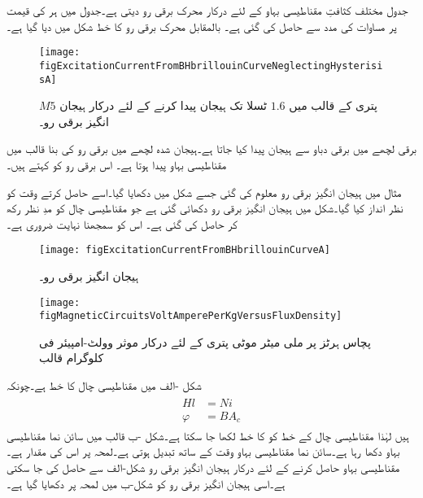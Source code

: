 جدول   مختلف کثافتِ مقناطیسی بہاو کے لئے درکار محرک برقی رو دیتی ہے۔جدول میں  ہر  کی قیمت پر   مساوات   کی مدد سے حاصل کی گئی ہے۔ بالمقابل محرک برقی رو کا خط شکل  میں دیا گیا ہے۔
%
\begin{figure}
\centering
\texttt{[image: figExcitationCurrentFromBHbrillouinCurveNeglectingHysterisisA]}
\caption{$M5$ پتری کے قالب میں $1.6$ ٹسلا تک ہیجان پیدا کرنے کے لئے درکار ہیجان انگیز برقی رو۔}
\label{شکل_مقناطیسی_ادوار_ہیجان_رو_چال_نظرانداز}
\end{figure}
برقی لچھے میں برقی دباو سے ہیجان پیدا کیا جاتا ہے۔ہیجان شدہ لچھے میں برقی رو کی بنا  قالب میں مقناطیسی بہاو پیدا ہوتا ہے۔ اس برقی رو  کو   کہتے ہیں۔

مثال  میں ہیجان انگیز برقی رو معلوم کی گئی جسے شکل  میں دکھایا گیا۔اسے حاصل کرتے وقت  کو نظر انداز کیا گیا۔شکل  میں ہیجان انگیز برقی رو  دکھائی گئی ہے جو مقناطیسی چال کو مدِ نظر رکھ کر حاصل کی گئی ہے۔ اس کو سمجھنا نہایت ضروری ہے۔
\begin{figure}
\centering
\texttt{[image: figExcitationCurrentFromBHbrillouinCurveA]}
\caption{ہیجان انگیز برقی رو۔}
\label{شکل_مقناطیسی_ادوار_ہیجان_رو_بشمول_اثر_چال}
\end{figure}
%
\begin{figure}
\texttt{[image: figMagneticCircuitsVoltAmperePerKgVersusFluxDensity]}
\caption{پچاس ہرٹز پر  ملی میٹر موٹی پتری کے لئے درکار موثر وولٹ-امپیئر فی کلوگرام قالب}
\label{شکل_مقناطیسی_دور_درکار_ہیجان_وولٹ_ایمپیئر}
\end{figure}
شکل -الف میں  مقناطیسی چال کا خط ہے۔چونکہ
\begin{gather}
\begin{aligned}
H l& =N i\\
\varphi&=B A_c
\end{aligned}
\end{gather}
ہیں لہٰذا مقناطیسی چال کے  خط کو  کا خط لکھا جا سکتا ہے۔شکل -ب قالب میں سائن نما مقناطیسی بہاو  دکھا رہا ہے۔سائن نما مقناطیسی بہاو وقت کے ساتھ تبدیل ہوتی ہے۔لمحہ  پر اس کی مقدار   ہے۔مقناطیسی بہاو  حاصل کرنے کے لئے درکار ہیجان انگیز برقی رو  شکل-الف سے حاصل کی جا سکتی ہے۔اسی  ہیجان انگیز برقی رو کو شکل-ب میں  لمحہ  پر دکھایا گیا ہے۔ 

